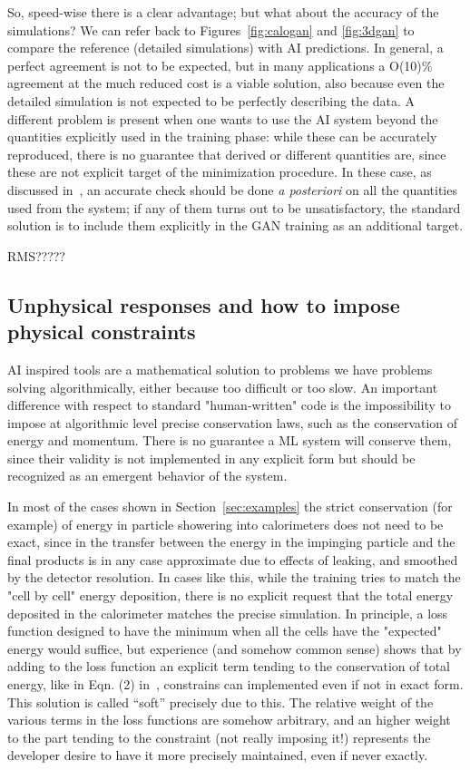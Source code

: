 So, speed-wise there is a clear advantage; but what about the accuracy of the simulations? 
We can refer back to Figures~\ref{fig:calogan} and \ref{fig:3dgan} to compare the reference (detailed simulations) with AI predictions. In general, a perfect agreement is not to be expected, but in many applications a O(10)\% agreement at the much reduced cost is a viable solution, also because even the detailed simulation is not expected to be perfectly describing the data. A different problem is present when one wants to use the AI system beyond the quantities explicitly used in the training phase: while these can be accurately reproduced, there is no guarantee that derived or different quantities are, since these are not explicit target of the minimization procedure. In these case, as discussed in~\cite{calogan}, an accurate check should be done \emph{a posteriori} on all the quantities used from the system; if any of them turns out to be unsatisfactory, the standard solution is to include them explicitly in the GAN training as an additional target.

RMS?????

\subsection{Unphysical responses and how to impose physical constraints}
\label{subsec:physical}
AI inspired tools are a mathematical solution to problems we have problems solving algorithmically, either because too difficult or too slow.
An important difference with respect to standard "human-written" code is the impossibility to impose at algorithmic level precise conservation laws, such as the conservation of energy and momentum.
There is no guarantee a ML system will conserve them, since their validity is not implemented in any explicit form but should be recognized  as an emergent behavior of the system.

In most of the cases shown in Section~\ref{sec:examples} the strict conservation (for example) of energy in particle showering into calorimeters does not need to be exact, since in the transfer  between the energy in the impinging particle and the final products is in any case approximate due to effects of leaking, and smoothed by the detector resolution. In cases like this, while the training tries to  match the "cell by cell" energy deposition, there is no explicit request that the total energy deposited in the calorimeter matches the precise simulation. In principle, a loss function designed to have the minimum when all the cells have the "expected" energy would suffice, but experience (and somehow common sense) shows that by adding to the loss function an explicit term tending to the conservation of total energy, like in Eqn. (2) in~\cite{calogan}, constrains can implemented even if not in exact form. This solution is called ``soft'' precisely due to this.
The relative weight of the various terms in the loss functions are somehow arbitrary, and an higher weight to the part tending to the constraint (not really imposing it!) represents the developer desire to have it more precisely maintained, even if never exactly.

